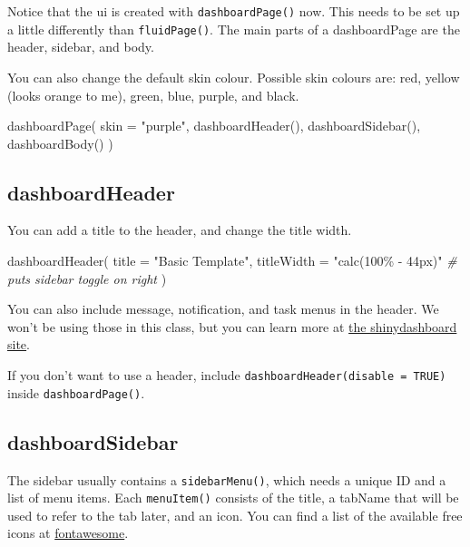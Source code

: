 \documentclass[
]{book}
\newenvironment{Shaded}{\begin{snugshade}}{\end{snugshade}}
\newcommand{\AttributeTok}[1]{\textcolor[rgb]{0.77,0.63,0.00}{#1}}
\newcommand{\CommentTok}[1]{\textcolor[rgb]{0.56,0.35,0.01}{\textit{#1}}}
\newcommand{\FunctionTok}[1]{\textcolor[rgb]{0.00,0.00,0.00}{#1}}
\newcommand{\NormalTok}[1]{#1}
\newcommand{\StringTok}[1]{\textcolor[rgb]{0.31,0.60,0.02}{#1}}
\begin{document}
Notice that the ui is created with \texttt{dashboardPage()} now. This needs to be set up a little differently than \texttt{fluidPage()}. The main parts of a dashboardPage are the header, sidebar, and body.

You can also change the default skin colour. Possible skin colours are: red, yellow (looks orange to me), green, blue, purple, and black.

\begin{Shaded}
\begin{Highlighting}[]
\FunctionTok{dashboardPage}\NormalTok{(}
    \AttributeTok{skin =} \StringTok{"purple"}\NormalTok{,}
    \FunctionTok{dashboardHeader}\NormalTok{(),}
    \FunctionTok{dashboardSidebar}\NormalTok{(),}
    \FunctionTok{dashboardBody}\NormalTok{()}
\NormalTok{)}
\end{Highlighting}
\end{Shaded}

\hypertarget{dashboardheader}{%
\subsection{dashboardHeader}\label{dashboardheader}}

You can add a title to the header, and change the title width.

\begin{Shaded}
\begin{Highlighting}[]
\FunctionTok{dashboardHeader}\NormalTok{(}
  \AttributeTok{title =} \StringTok{"Basic Template"}\NormalTok{, }
  \AttributeTok{titleWidth =} \StringTok{"calc(100\% {-} 44px)"} \CommentTok{\# puts sidebar toggle on right}
\NormalTok{)}
\end{Highlighting}
\end{Shaded}

You can also include message, notification, and task menus in the header. We won't be using those in this class, but you can learn more at \href{https://rstudio.github.io/shinydashboard/structure.html\#message-menus}{the shinydashboard site}.

If you don't want to use a header, include \texttt{dashboardHeader(disable\ =\ TRUE)} inside \texttt{dashboardPage()}.

\hypertarget{dashboardsidebar}{%
\subsection{dashboardSidebar}\label{dashboardsidebar}}

The sidebar usually contains a \texttt{sidebarMenu()}, which needs a unique ID and a list of menu items. Each \texttt{menuItem()} consists of the title, a tabName that will be used to refer to the tab later, and an icon. You can find a list of the available free icons at \href{https://fontawesome.com/icons?d=gallery\&m=free}{fontawesome}.
\end{document}
